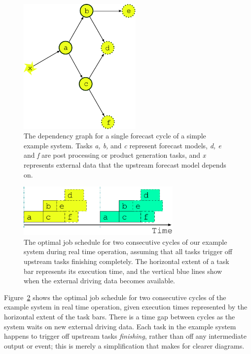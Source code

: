 \documentclass[11pt,a4paper]{article}
\begin{document}
\begin{figure}
    \begin{center}
        \includegraphics[width=6cm]{inkscape-svg/dep-one-cycle} 
    \end{center}
    \caption[Single cycle dependency graph for a simple system]{\small
    The dependency graph for a single forecast cycle of a simple example
    system. Tasks {\em a, b,} and {\em c} represent forecast models,
    {\em d, e} and {\em f} are post processing or product generation
    tasks, and {\em x} represents external data that the upstream
    forecast model depends on.}
    \label{fig-dep-one} 
\end{figure} 

\begin{figure}
    \begin{center}
        \includegraphics[width=8cm]{inkscape-svg/timeline-one}
    \end{center}
    \caption[Single cycle job schedules for real time operation]{\small
    The optimal job schedule for two consecutive cycles of our example
    system during real time operation, assuming that all tasks trigger 
    off upstream tasks finishing completely. The horizontal extent of
    a task bar represents its execution time, and the vertical blue
    lines show when the external driving data becomes available.}
    \label{fig-time-one}
\end{figure}

Figure~\ref{fig-time-one} shows the optimal job schedule for two
consecutive cycles of the example system in real time operation, given
execution times represented by the horizontal extent of the task bars.
There is a time gap between cycles as the system waits on new external
driving data.  Each task in the example system happens to trigger off
upstream tasks {\em finishing}, rather than off any intermediate output
or event; this is merely a simplification that makes for clearer diagrams.
\end{document}
